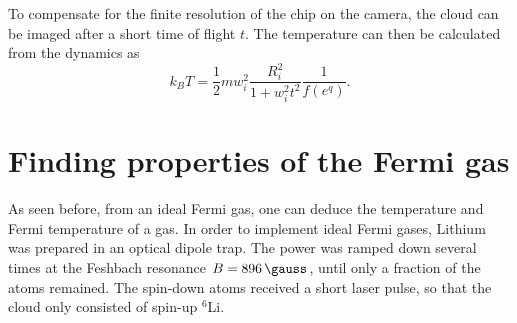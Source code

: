 To compensate for the finite resolution of the chip on the camera, the cloud can be imaged after a short time of flight $t$. The temperature can then be calculated from the dynamics as
\begin{equation}
\label{eq:temp}
k_BT = \frac{1}{2} mw_i^2 \frac{R_i^2}{1+w_i^2t^2}\frac{1}{f(e^q)}.
\end{equation}


	
\section{Finding properties of the Fermi gas}

As seen before, from an ideal Fermi gas, one can deduce the temperature and Fermi temperature of a gas.
In order to implement ideal Fermi gases, Lithium was prepared in an optical dipole trap. The power was ramped down several times at the Feshbach resonance $B=\SI{896}{\gauss}$, until only a fraction of the atoms remained. The spin-down atoms received a short laser pulse, so that the cloud only consisted of spin-up $^6$Li.


